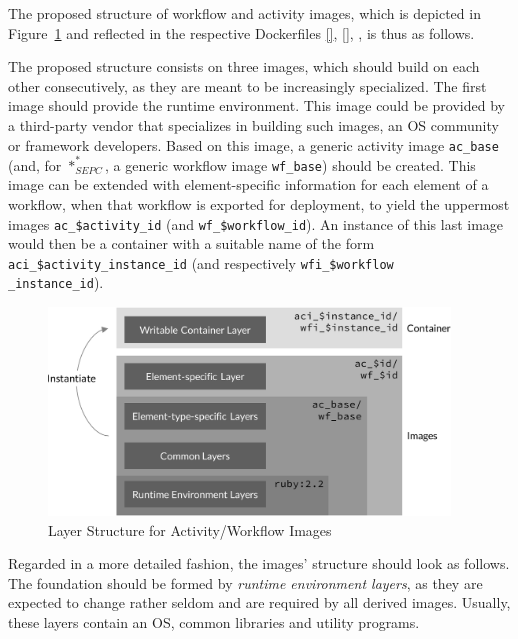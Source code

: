   The proposed structure of workflow and activity images, which is depicted in Figure~\ref{fig:layers_for_element_wrapping_containers} and reflected in the respective Dockerfiles \ref{}, \ref{}, , is thus as follows.

  The proposed structure consists on three images, which should build on each other consecutively, as they are meant to be increasingly specialized. The first image should provide the runtime environment. This image could be provided by a third-party vendor that specializes in building such images, \ie an \ac{OS} community or framework developers. Based on this image, a generic activity image \texttt{ac\_base} (and, for $*_{SEPC}^{*}$, a generic workflow image \texttt{wf\_base}) should be created. This image can be extended with element-specific information for each element of a workflow, when that workflow is exported for deployment, to yield the uppermost images \texttt{ac\_\$activity\_id} (and \texttt{wf\_\$workflow\_id}). An instance of this last image would then be a container with a suitable name of the form \texttt{aci\_\$activity\_instance\_id} (and respectively \texttt{wfi\_\$workflow\\\_instance\_id}).

  \begin{figure}[htbp]
    \centering
    \includegraphics[width=0.95\textwidth]{content/images/layer_concept-crop.pdf}
    \caption{Layer Structure for Activity/Workflow Images}
    \label{fig:layers_for_element_wrapping_containers}
  \end{figure}

  Regarded in a more detailed fashion, the images' structure should look as follows.
  The foundation should be formed by \emph{runtime environment layers}, as they are expected to change rather seldom and are required by all derived images. Usually, these layers contain an \ac{OS}, common libraries and utility programs.

